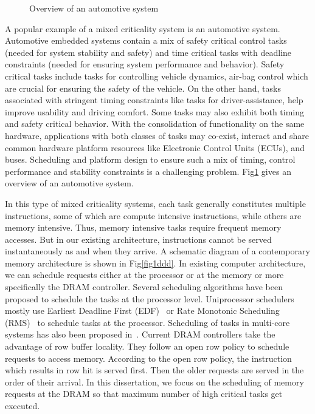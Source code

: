 \begin{figure}[t]
 \centering
\caption{Overview of an automotive system}
\label{fig3abc}
\end{figure}

\noindent
A popular example of a mixed criticality system is an automotive system.
Automotive embedded systems contain a mix of safety critical control tasks (needed for system stability and safety) and
time critical tasks with deadline constraints (needed for ensuring system performance and behavior). Safety critical
tasks include tasks for controlling vehicle dynamics, air-bag control which are crucial for ensuring the safety of the 
vehicle. On the other hand, tasks associated with stringent timing constraints like tasks for driver-assistance, help improve 
usability and driving comfort. Some tasks may also exhibit both timing and safety critical behavior. With the consolidation of 
functionality on the same hardware, applications with both classes of tasks may co-exist, interact and share common hardware 
platform resources like Electronic Control Units (ECUs), and buses. Scheduling and platform design to ensure such a mix of 
timing, control performance and stability constraints is a challenging problem. Fig\ref{fig3abc} gives an overview of an 
automotive system.


\noindent
In this type of mixed criticality systems, each task generally constitutes multiple instructions, some of which are compute 
intensive instructions, while others are memory intensive. Thus, memory intensive tasks require frequent memory accesses. But 
in our existing architecture, instructions cannot be served instantaneously as and when they arrive. A schematic diagram of a 
contemporary memory architecture is shown in Fig\ref{fig1ddd}. In existing computer architecture, we can schedule requests either 
at the processor or at the memory or more specifically the DRAM controller. Several scheduling algorithms have been proposed to 
schedule the tasks at the processor level. Uniprocessor schedulers mostly use Earliest Deadline First (EDF)~\cite{wiki:xxx2} 
or Rate Monotonic Scheduling (RMS)~\cite{wiki:xxx3} to schedule tasks at the processor. Scheduling of tasks in multi-core 
systems has also been proposed in~\cite{Giannopoulou:2013:SMA:2555754.2555771}. Current DRAM controllers take the advantage 
of row buffer locality. They follow an open row policy to schedule requests to access memory. According to the open row 
policy, the instruction which results in row hit is served first. Then the older requests are served in the order of their 
arrival. In this dissertation, we focus on the scheduling of memory requests at the DRAM so that maximum number of high 
critical tasks get executed.

